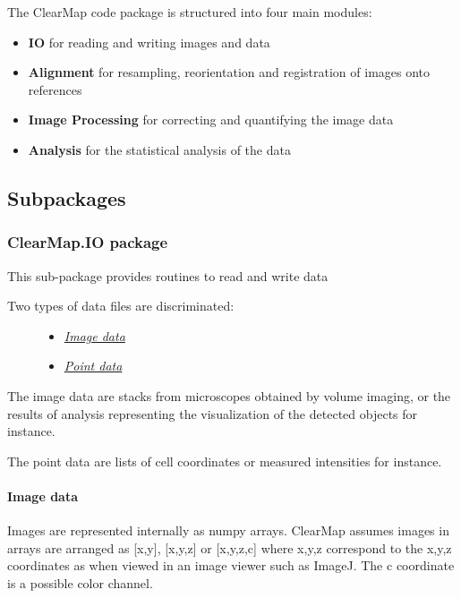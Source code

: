 \documentclass[letterpaper,10pt,english]{sphinxmanual}
\begin{document}
The ClearMap code package is structured into four main modules:
\begin{itemize}
\item {} 
\textbf{IO} for reading and writing images and data

\item {} 
\textbf{Alignment} for resampling, reorientation and registration of images onto references

\item {} 
\textbf{Image Processing} for correcting and quantifying the image data

\item {} 
\textbf{Analysis} for the statistical analysis of the data

\end{itemize}


\subsection{Subpackages}
\label{api/ClearMap:subpackages}

\subsubsection{ClearMap.IO package}
\label{api/ClearMap.IO:clearmap-io-package}\label{api/ClearMap.IO::doc}\label{api/ClearMap.IO:module-ClearMap.IO}
This sub-package provides routines to read and write data
\begin{description}
\item[{Two types of data files are discriminated:}] \leavevmode\begin{itemize}
\item {} 
{\hyperref[api/ClearMap.IO:image-data]{\emph{Image data}}}

\item {} 
{\hyperref[api/ClearMap.IO:point-data]{\emph{Point data}}}

\end{itemize}

\end{description}

The image data are stacks from microscopes obtained by volume imaging, or the results of analysis representing
the visualization of the detected objects for instance.

The point data are lists of cell coordinates or measured intensities for instance.


\paragraph{Image data}
\label{api/ClearMap.IO:image-data}
Images are represented internally as numpy arrays. ClearMap assumes images
in arrays are arranged as {[}x,y{]}, {[}x,y,z{]} or {[}x,y,z,c{]} where x,y,z correspond to
the x,y,z coordinates as when viewed in an image viewer such as ImageJ.
The c coordinate is a possible color channel.
\end{document}

